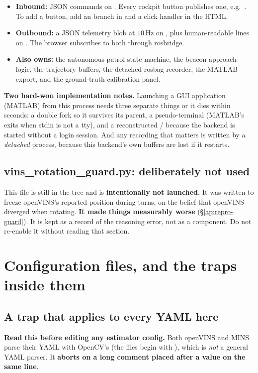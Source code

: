 \begin{itemize}[leftmargin=1.4em]
\item \textbf{Inbound:} JSON commands on . Every cockpit
  button publishes one, e.g.\ . To add a button, add an 
  branch in  and a click handler in the HTML.
\item \textbf{Outbound:} a JSON telemetry blob at $10$\,Hz on
  , plus human-readable lines on
  . The browser subscribes to both through rosbridge.
\item \textbf{Also owns:} the autonomous patrol state machine, the beacon
  approach logic, the trajectory buffers, the detached rosbag recorder, the
  MATLAB export, and the ground-truth calibration panel.
\end{itemize}

\noindent \textbf{Two hard-won implementation notes.} Launching a GUI
application (MATLAB) from this process needs three separate things or it dies
within seconds: a double fork so it survives its parent, a pseudo-terminal
(MATLAB's  exits when stdin is not a tty), and a reconstructed
/ because the backend
is started without a login session. And any recording that matters is written
by a \emph{detached}  process, because this backend's own buffers
are lost if it restarts.

\subsection{vins\_rotation\_guard.py: deliberately not used}
\label{ap:repro-guardfile}
This file is still in the tree and is \textbf{intentionally not launched.} It
was written to freeze openVINS's reported position during turns, on the belief
that openVINS diverged when rotating. \textbf{It made things measurably worse}
(\S\ref{ap:repro-guard}). It is kept as a record of the reasoning error, not as
a component. Do not re-enable it without reading that section.

\section{Configuration files, and the traps inside them}
\label{ap:repro-config}
\subsection{A trap that applies to every YAML here}
\label{ap:repro-yamltrap}
\textbf{Read this before editing any estimator config.} Both openVINS and MINS
parse their YAML with OpenCV's  (the files begin with
), which is \emph{not} a general YAML parser. It
\textbf{aborts on a long comment placed after a value on the same line}.

